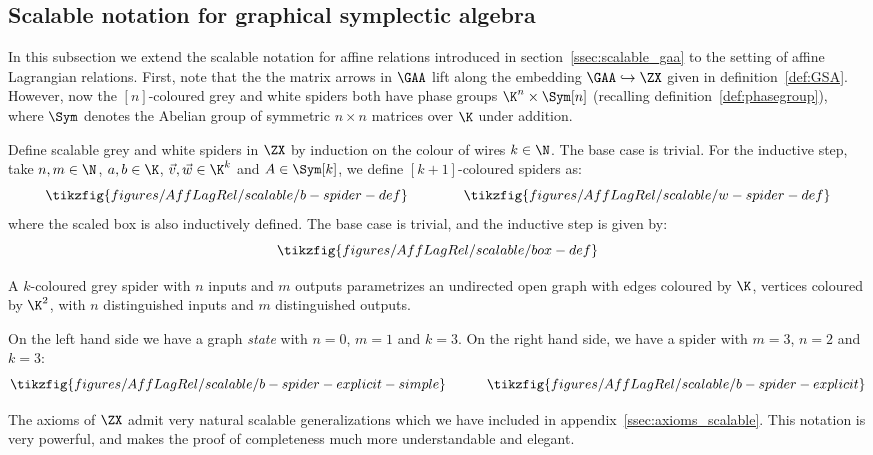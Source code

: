 \subsection{Scalable notation for graphical symplectic algebra}
\label{ssec:scalable_symplectic}
In this subsection we extend the scalable notation for affine relations introduced in
section~\ref{ssec:scalable_gaa} to the setting of affine Lagrangian relations.
First, note that the the matrix arrows in  \(\GAA\) lift along the embedding
 \(\GAA\hookrightarrow\ZX\) given in definition~\ref{def:GSA}.  However, now the  \([n]\)-coloured grey and white spiders both have phase groups \(\K^n \times
\Sym[n]\) (recalling definition~\ref{def:phasegroup}), where  \(\Sym\) denotes the Abelian group of symmetric \(n \times n\) matrices over \(\K\) under addition.
\begin{definition}
  \label{def:scalable_spider}
  Define scalable grey and white spiders in \(\ZX\) by induction on the colour of wires \(k\in\N\).
  The base case is trivial.  For the inductive step, take \(n,m\in \N\), \(a,b\in \K\), \(\vec v, \vec w \in \K^k\) and \(A\in\Sym[k]\), we define  \([k+1]\)-coloured spiders as:
  \begin{equation}
    \label{eq:thick_spider_def}
    \tikzfig{figures/AffLagRel/scalable/b-spider-def}
    \quad\quad\quad\quad
    \tikzfig{figures/AffLagRel/scalable/w-spider-def}
  \end{equation}
  where the scaled box is also inductively defined.  The base case is trivial, and the inductive step is given by:
  \begin{equation}
    \label{eq:scalable_box}
    \tikzfig{figures/AffLagRel/scalable/box-def}
  \end{equation}
\end{definition}
A \(k\)-coloured grey spider with \(n\) inputs and \(m\) outputs parametrizes an undirected open graph with edges coloured by \(\K\), vertices coloured by \(\K^2\), with \(n\) distinguished inputs and \(m\) distinguished outputs.
\begin{example}
  \label{ex:scalable_graph_example}
  On the left hand side we have a graph {\em state} with \(n = 0\), \(m=1\) and \(k=3\).  On the right hand side, we have a spider with  \(m = 3\),  \(n = 2\) and \(k =
  3\):
  \begin{equation}
    \tikzfig{figures/AffLagRel/scalable/b-spider-explicit-simple}
    \quad\quad\quad
    \tikzfig{figures/AffLagRel/scalable/b-spider-explicit}
  \end{equation}
\end{example}
The axioms of \(\ZX\) admit very natural scalable generalizations which we have included in appendix~\ref{ssec:axioms_scalable}.  This notation is very powerful, and makes the proof of completeness much more understandable and elegant.
